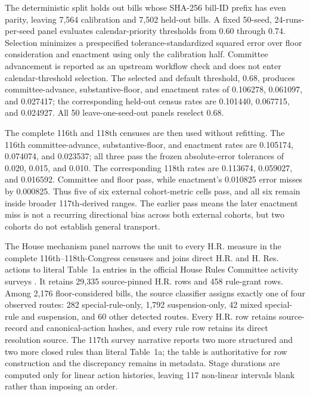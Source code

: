 \documentclass[manuscript]{acmart}
\begin{document}
The deterministic split holds out bills whose SHA-256 bill-ID prefix has even parity, leaving 7,564 calibration and 7,502 held-out bills. A fixed 50-seed, 24-runs-per-seed panel evaluates calendar-priority thresholds from 0.60 through 0.74. Selection minimizes a prespecified tolerance-standardized squared error over floor consideration and enactment using only the calibration half. Committee advancement is reported as an upstream workflow check and does not enter calendar-threshold selection. The selected and default threshold, 0.68, produces committee-advance, substantive-floor, and enactment rates of 0.106278, 0.061097, and 0.027417; the corresponding held-out census rates are 0.101440, 0.067715, and 0.024927. All 50 leave-one-seed-out panels reselect 0.68.

The complete 116th and 118th censuses are then used without refitting. The 116th committee-advance, substantive-floor, and enactment rates are 0.105174, 0.074074, and 0.023537; all three pass the frozen absolute-error tolerances of 0.020, 0.015, and 0.010. The corresponding 118th rates are 0.113674, 0.059027, and 0.016592. Committee and floor pass, while enactment's 0.010825 error misses by 0.000825. Thus five of six external cohort-metric cells pass, and all six remain inside broader 117th-derived ranges. The earlier pass means the later enactment miss is not a recurring directional bias across both external cohorts, but two cohorts do not establish general transport.

The House mechanism panel narrows the unit to every H.R. measure in the complete 116th--118th-Congress censuses and joins direct H.R. and H. Res. actions to literal Table~1a entries in the official House Rules Committee activity surveys \citep{HouseRulesSurvey116,HouseRulesSurvey117,HouseRulesSurvey118}. It retains 29,335 source-pinned H.R. rows and 458 rule-grant rows. Among 2,176 floor-considered bills, the source classifier assigns exactly one of four observed routes: 282 special-rule-only, 1,792 suspension-only, 42 mixed special-rule and suspension, and 60 other detected routes. Every H.R. row retains source-record and canonical-action hashes, and every rule row retains its direct resolution source. The 117th survey narrative reports two more structured and two more closed rules than literal Table~1a; the table is authoritative for row construction and the discrepancy remains in metadata. Stage durations are computed only for linear action histories, leaving 117 non-linear intervals blank rather than imposing an order.
\end{document}
